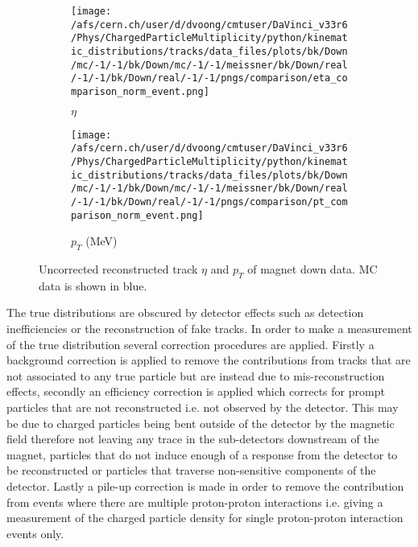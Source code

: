 \begin{figure}
	\begin{subfigure}[h]{0.49\textwidth}
		\texttt{[image: /afs/cern.ch/user/d/dvoong/cmtuser/DaVinci\_v33r6/Phys/ChargedParticleMultiplicity/python/kinematic\_distributions/tracks/data\_files/plots/bk/Down/mc/-1/-1/bk/Down/mc/-1/-1/meissner/bk/Down/real/-1/-1/bk/Down/real/-1/-1/pngs/comparison/eta\_comparison\_norm\_event.png]}
		\caption{$\eta$}
		\label{fig: reconstructed eta mag down comparison}
	\end{subfigure}
	\centering
	\begin{subfigure}[h]{0.49\textwidth}
		\texttt{[image: /afs/cern.ch/user/d/dvoong/cmtuser/DaVinci\_v33r6/Phys/ChargedParticleMultiplicity/python/kinematic\_distributions/tracks/data\_files/plots/bk/Down/mc/-1/-1/bk/Down/mc/-1/-1/meissner/bk/Down/real/-1/-1/bk/Down/real/-1/-1/pngs/comparison/pt\_comparison\_norm\_event.png]}
		\caption{$p_T$ (MeV)}
		\label{fig: reconstructed pt mag down comparison}
	\end{subfigure}
	\caption{Uncorrected reconstructed track $\eta$ and $p_T$ of magnet down data. MC data is shown in blue.}
	\label{fig: reconstructed track eta, phi, pt and p mag down comparison}
\end{figure}

The true distributions are obscured by detector effects such as detection inefficiencies or the reconstruction of fake tracks. In order to make a measurement of the true distribution several correction procedures are applied. Firstly a background correction is applied to remove the contributions from tracks that are not associated to any true particle but are instead due to mis-reconstruction effects, secondly an efficiency correction is applied which corrects for prompt particles that are not reconstructed i.e. not observed by the detector. This may be due to charged particles being bent outside of the detector by the magnetic field therefore not leaving any trace in the sub-detectors downstream of the magnet, particles that do not induce enough of a response from the detector to be reconstructed or particles that traverse non-sensitive components of the detector. Lastly a pile-up correction is made in order to remove the contribution from events where there are multiple proton-proton interactions i.e. giving a measurement of the charged particle density for single proton-proton interaction events only.


